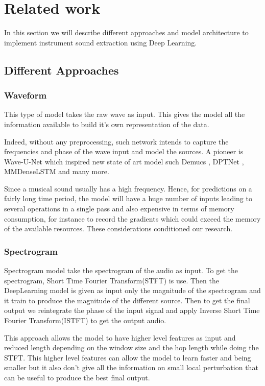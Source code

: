 \documentclass[final]{cvpr}
\begin{document}
\section{Related work}

In this section we will describe different approaches and model architecture to implement instrument sound extraction using Deep Learning.

\subsection{Different Approaches}
\subsubsection{Waveform}

This type of model takes the raw wave as input. This gives the model all the information available to build it's own representation of the data.
 
Indeed, without any preprocessing, such network intends to capture the frequencies and phase of the wave input and model the sources. A pioneer is Wave-U-Net \cite{waveunet} which inspired new state of art model such Demucs \cite{defossez2019music}, DPTNet \cite{dptnet}, MMDenseLSTM \cite{mm_dense_lstm} and many more.

Since a musical sound usually has a high frequency. Hence, for predictions on a fairly long time period, the model will have a huge number of inputs leading to several operations in a single pass and also expensive in terms of memory consumption, for instance to record the gradients which could exceed the memory of the available resources.
These considerations conditioned our research. 

\subsubsection{Spectrogram}

Spectrogram model take the spectrogram of the audio as input.
To get the spectrogram, Short Time Fourier Transform(STFT) is use.
Then the DeepLearning model is given as input only the magnitude of the spectrogram and it train to produce the magnitude of the different source.
Then to get the final output we reintegrate the phase of the input signal and apply Inverse Short Time Fourier Transform(ISTFT) to get the output audio.

This approach allows the model to have higher level features as input and reduced length depending on the window size and the hop length while doing the STFT.
This higher level features can allow the model to learn faster and being smaller but it also don't give all the information on small local perturbation that can be useful to produce the best final output.
\end{document}
